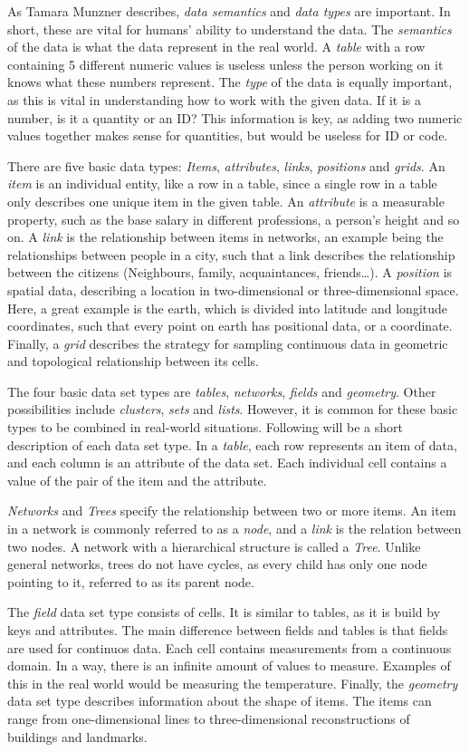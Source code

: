 \documentclass[Report.tex]{subfiles}
\begin{document}
As Tamara Munzner describes, \emph{data semantics} and \emph{data types} are important. In short, these are vital for humans’ ability to understand the data. The \emph{semantics} of the data is what the data represent in the real world. A \emph{table} with a row containing 5 different numeric values is useless unless the person working on it knows what these numbers represent. The \emph{type} of the data is equally important, as this is vital in understanding how to work with the given data. If it is a number, is it a quantity or an ID? This information is key, as adding two numeric values together makes sense for quantities, but would be useless for ID or code.

There are five basic data types: \emph{Items}, \emph{attributes}, \emph{links}, \emph{positions} and \emph{grids}. An \emph{item} is an individual entity, like a row in a table, since a single row in a table only describes one unique item in the given table. An \emph{attribute} is a measurable property, such as the base salary in different professions, a person’s height and so on. A \emph{link} is the relationship between items in networks, an example being the relationships between people in a city, such that a link describes the relationship between the citizens (Neighbours, family, acquaintances, friends…). A \emph{position} is spatial data, describing a location in two-dimensional or three-dimensional space. Here, a great example is the earth, which is divided into latitude and longitude coordinates, such that every point on earth has positional data, or a coordinate. Finally, a \emph{grid} describes the strategy for sampling continuous data in geometric and topological relationship between its cells.

The four basic data set types are \emph{tables}, \emph{networks}, \emph{fields} and \emph{geometry}. Other possibilities include \emph{clusters}, \emph{sets} and \emph{lists}. However, it is common for these basic types to be combined in real-world situations. Following will be a short description of each data set type. 
In a \emph{table}, each row represents an item of data, and each column is an attribute of the data set. Each individual cell contains a value of the pair of the item and the attribute.


\emph{Networks} and \emph{Trees} specify the relationship between two or more items. An item in a network is commonly referred to as a \emph{node}, and a \emph{link} is the relation between two nodes. 
A network with a hierarchical structure is called a \emph{Tree}. Unlike general networks, trees do not have cycles, as every child has only one node pointing to it, referred to as its parent node.


The \emph{field} data set type consists of cells. It is similar to tables, as it is build by keys and attributes. The main difference between fields and tables is that fields are used for continuos data. Each cell contains measurements from a continuous domain. In a way, there is an infinite amount of values to measure. Examples of this in the real world would be measuring the temperature. 
Finally, the \emph{geometry} data set type describes information about the shape of items. The items can range from one-dimensional lines to three-dimensional reconstructions of buildings and landmarks.  
\end{document}

